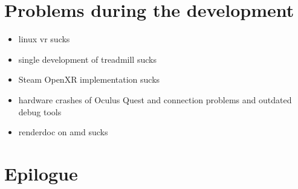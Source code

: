 \label{sec:problems}
\section{Problems during the development}
\begin{itemize}
    \item linux vr sucks
    \item single development of treadmill sucks
    \item Steam OpenXR implementation sucks
    \item hardware crashes of Oculus Quest and connection problems and outdated debug tools
    \item renderdoc on amd sucks
\end{itemize}
\section{Epilogue}
